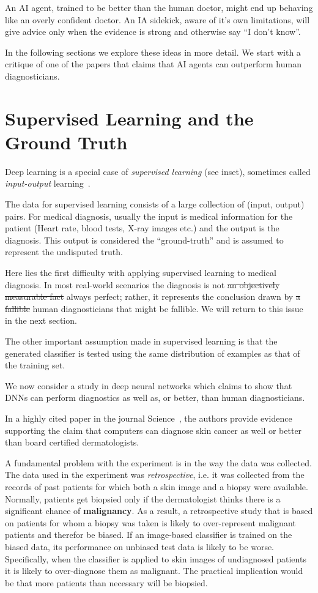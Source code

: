 \documentclass[11pt]{pnas-new}
\begin{document}
An AI agent, trained to be better than the human doctor, might end up
behaving like an overly confident doctor. An IA sidekick, aware of
it's own limitations, will give advice only when the evidence is
strong and otherwise say ``I don't know''.

In the following sections we explore these ideas in more detail. We
start with a critique of one of the papers that claims that AI agents
can outperform human diagnosticians.

\section{Supervised Learning and the Ground Truth}
\label{sec:ground-truth}

Deep learning is a special case of {\em supervised learning} (see
inset), sometimes called {\em input-output}
learning~\cite{ng2016artificial,topol2019deep}.

The data for supervised learning consists of a large collection of
(input, output) pairs. For medical diagnosis, {\color{red}usually} the input is medical
information for the patient (Heart rate, blood tests, X-ray images
etc.) and the output is the diagnosis. This output is considered the
``ground-truth'' and is assumed to represent the undisputed truth.

Here lies the first difficulty with applying supervised learning
to medical diagnosis. In most real-world scenarios the diagnosis
is not \sout{an objectively measurable fact} {\color{red}always perfect}; rather, it
represents the conclusion drawn by \sout{a fallible} human diagnosticians {\color{red}that might be fallible}. We  will
return to this issue in the next section.

The other important assumption made in supervised learning is that the
generated classifier is tested using the same distribution of examples
as that of the training set.

We now consider a study in deep neural networks which claims to show
that DNNs can perform diagnostics as well as, or better, than human diagnosticians. 

In a highly cited paper in the journal
Science~\cite{esteva2017dermatologist}, the authors provide evidence supporting
the claim that computers can diagnose skin cancer as well or better than board
certified dermatologists.

A fundamental problem with the experiment is in the way the data was
collected. The data used in the experiment was {\em retrospective},
i.e. it was collected from the records of past patients for which both
a skin image and a biopsy were available. Normally, patients get
biopsied only if the dermatologist thinks there is a significant
chance of {\bf malignancy}. As a result, a retrospective study that is
based on patients for whom a biopsy was taken is likely to
over-represent malignant patients and therefor be biased. If an image-based classifier
is trained on the biased data, its performance on unbiased test data
is likely to be worse. Specifically, when the classifier is applied to skin
images of undiagnosed patients it is likely to over-diagnose them as
malignant. The practical implication would be that more patients than
necessary will be biopsied.
\end{document}
